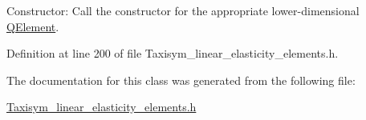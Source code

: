Constructor\+: Call the constructor for the appropriate lower-\/dimensional \hyperlink{classoomph_1_1QElement}{Q\+Element}. 



Definition at line 200 of file Taxisym\+\_\+linear\+\_\+elasticity\+\_\+elements.\+h.



The documentation for this class was generated from the following file\+:\begin{DoxyCompactItemize}
\item 
\hyperlink{Taxisym__linear__elasticity__elements_8h}{Taxisym\+\_\+linear\+\_\+elasticity\+\_\+elements.\+h}\end{DoxyCompactItemize}
